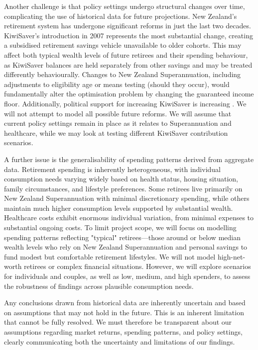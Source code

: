\documentclass[11pt]{article}
\begin{document}
Another challenge is that policy settings undergo structural changes over time, complicating the use of historical data for future projections. New Zealand's retirement system has undergone significant reforms in just the last two decades. KiwiSaver's introduction in 2007 represents the most substantial change, creating a subsidised retirement savings vehicle unavailable to older cohorts. This may affect both typical wealth levels of future retirees and their spending behaviour, as KiwiSaver balances are held separately from other savings and may be treated differently behaviourally. Changes to New Zealand Superannuation, including adjustments to eligibility age or means testing (should they occur), would fundamentally alter the optimisation problem by changing the guaranteed income floor. Additionally, political support for increasing KiwiSaver is increasing \parencite[e.g.][]{national2025kiwisaver}. We will not attempt to model all possible future reforms. We will assume that current policy settings remain in place as it relates to Superannuation and healthcare, while we may look at testing different KiwiSaver contribution scenarios.

A further issue is the generalisability of spending patterns derived from aggregate data. Retirement spending is inherently heterogeneous, with individual consumption needs varying widely based on health status, housing situation, family circumstances, and lifestyle preferences. Some retirees live primarily on New Zealand Superannuation with minimal discretionary spending, while others maintain much higher consumption levels supported by substantial wealth. Healthcare costs exhibit enormous individual variation, from minimal expenses to substantial ongoing costs. To limit project scope, we will focus on modelling spending patterns reflecting "typical" retirees—those around or below median wealth levels who rely on New Zealand Superannuation and personal savings to fund modest but comfortable retirement lifestyles. We will not model high-net-worth retirees or complex financial situations. However, we will explore scenarios for individuals and couples, as well as low, medium, and high spenders, to assess the robustness of findings across plausible consumption needs.

Any conclusions drawn from historical data are inherently uncertain and based on assumptions that may not hold in the future. This is an inherent limitation that cannot be fully resolved. We must therefore be transparent about our assumptions regarding market returns, spending patterns, and policy settings, clearly communicating both the uncertainty and limitations of our findings.
\end{document}
